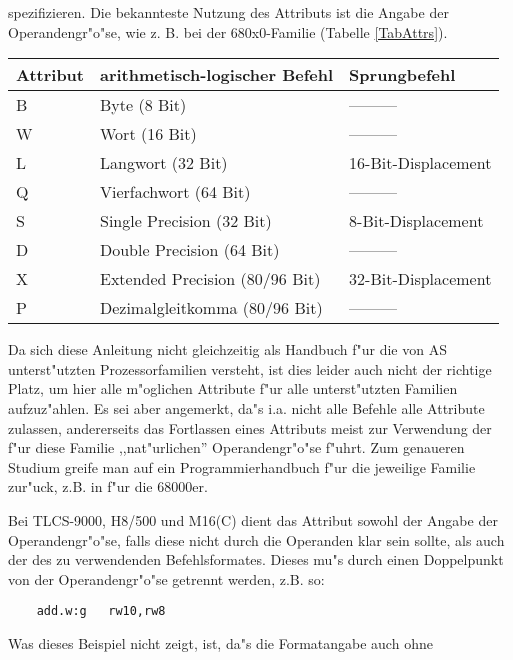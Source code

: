 \documentclass[12pt,a4paper,twoside]{report}
\begin{document}
spezifizieren.  Die bekannteste Nutzung des Attributs ist die Angabe der
Operandengr"o"se, wie z. B. bei der 680x0-Familie (Tabelle
\ref{TabAttrs}).
\begin{table*}[htb]
\begin{center}\begin{tabular}{|l|l|l|}
\hline
Attribut & arithmetisch-logischer Befehl & Sprungbefehl \\
\hline
\hline
B     & Byte (8 Bit)                   & --------- \\
W     & Wort (16 Bit)                  & --------- \\
L     & Langwort (32 Bit)              & 16-Bit-Displacement \\
Q     & Vierfachwort (64 Bit)          & --------- \\
S     & Single Precision (32 Bit)      & 8-Bit-Displacement \\
D     & Double Precision (64 Bit)      & --------- \\
X     & Extended Precision (80/96 Bit) & 32-Bit-Displacement \\
P     & Dezimalgleitkomma (80/96 Bit)  & --------- \\
\hline
\end{tabular}\end{center}
\caption{Erlaubte Attribute (Beispiel 680x0) \label{TabAttrs}}
\end{table*}
\par
Da sich diese Anleitung nicht gleichzeitig als Handbuch f"ur die von AS
unterst"utzten Prozessorfamilien versteht, ist dies leider auch nicht der
richtige Platz, um hier alle m"oglichen Attribute f"ur alle unterst"utzten
Familien aufzuz"ahlen.  Es sei aber angemerkt, da"s i.a. nicht alle Befehle
alle Attribute zulassen, andererseits das Fortlassen eines Attributs meist
zur Verwendung der f"ur diese Familie ,,nat"urlichen'' Operandengr"o"se
f"uhrt.  Zum genaueren Studium greife man auf ein Programmierhandbuch f"ur
die jeweilige Familie zur"uck, z.B. in \cite{Williams} f"ur die 68000er.
\par
Bei TLCS-9000, H8/500 und M16(C) dient das Attribut sowohl der Angabe der
Operandengr"o"se, falls diese nicht durch die Operanden klar sein sollte,
als auch der des zu verwendenden Befehlsformates.
Dieses mu"s durch einen Doppelpunkt von der Operandengr"o"se getrennt werden,
z.B. so:
\begin{verbatim}
    add.w:g   rw10,rw8
\end{verbatim}
Was dieses Beispiel nicht zeigt, ist, da"s die Formatangabe auch ohne
\end{document}

